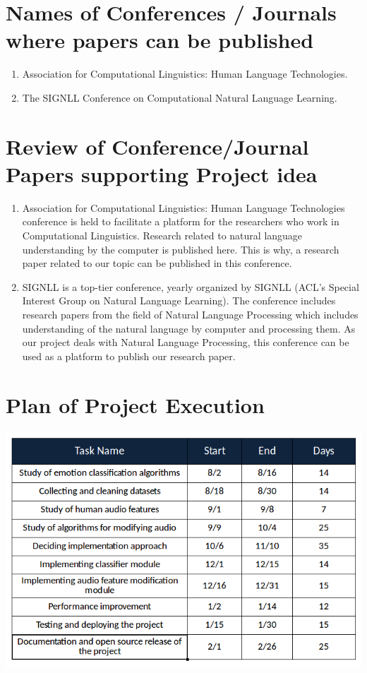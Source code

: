 \documentclass[oneside,a4paper,12pt]{book}
\begin{document}
\section{Names of Conferences / Journals where papers can be published}
\begin{enumerate}
\item Association for Computational Linguistics: Human Language Technologies.
\item The SIGNLL Conference on Computational Natural Language Learning.
\end{enumerate}

\section{Review of Conference/Journal Papers supporting Project idea}
\label{sec:survey}
\begin{enumerate}
\item Association for Computational Linguistics: Human Language Technologies conference is held to facilitate a platform for the researchers who work in Computational Linguistics. Research related to natural language understanding by the computer is published here. This is why, a research paper related to our topic can be published in this conference.
\item SIGNLL is a top-tier conference, yearly organized by SIGNLL (ACL's Special Interest Group on Natural Language Learning). The conference includes research papers from the field of Natural Language Processing which includes understanding of the natural language by computer and processing them. As our project deals with Natural Language Processing, this conference can be used as a platform to publish our research paper.
\end{enumerate}

\section{Plan of Project Execution}
\includegraphics[width=470pt]{project_plan.png} \\
\end{document}
